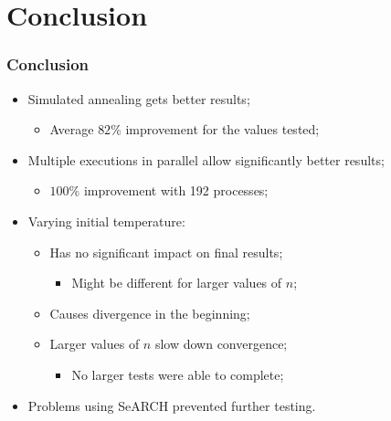\section{Conclusion}
\label{sec:conclusion}

\begin{frame}
	\frametitle{Conclusion}
	\begin{itemize}
		\vfill
		\item{Simulated annealing gets better results;
		\begin{itemize}
			\item{Average $82\%$ improvement for the values tested;}
		\end{itemize}
		}
		\vfill
		\item{Multiple executions in parallel allow significantly better results;
		\begin{itemize}
			\item{$100\%$ improvement with 192 processes;}
		\end{itemize}
		}
		\vfill
		\item{Varying initial temperature:
		\begin{itemize}
			\item{Has no significant impact on final results;
			\begin{itemize}
				\item{Might be different for larger values of $n$;}
			\end{itemize}
			}
			\item{Causes divergence in the beginning;}
			\item{Larger values of $n$ slow down convergence;
			\begin{itemize}
				\item{No larger tests were able to complete;}
			\end{itemize}
			}
		\end{itemize}
		}
		\vfill
		\item{Problems using SeARCH prevented further testing.}
		\vfill
	\end{itemize}
\end{frame}